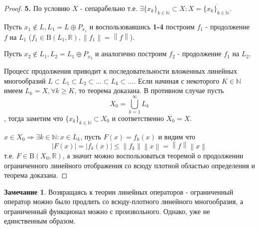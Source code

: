 \documentclass[12pt,a4paper]{article}
\theoremstyle{definition}
\newtheorem{corollaryth}{Замечание}[theorem]
\newcommand{\Real}{\mathbb{R}}
\newcommand{\Natural}{\mathbb{N}}
\newcommand{\norm}[1]{\left\lVert#1\right\rVert}
\newcommand{\bounded}[2]{\textrm{B}(#1, #2)}
\newcommand{\seq}[2]{\{#1\}_{#2}}
\begin{document}
\begin{proof}
	\textbf{5.} По условию $X$ - сепарабельно т.е. $\exists \seq{x_k}{k \in \Natural} \subset X: X = \overline{\seq{x_k}{k \in \Natural}}$. \newline
	
	\noindent Пусть $x_1 \notin L, L_1 = L \oplus P_{x_1}$ и воспользовавшись \textbf{1-4} построим $f_1$ - продолжение $f$ на $L_1$ ($f_1 \in \bounded{L_1}{\Real}, \norm{f_1} = \norm{f}$). \newline
	
	\noindent Пусть $x_2 \notin L_1, L_2 = L_1 \oplus P_{x_2}$ и аналогично построим $f_2$ - продолжение $f_1$ на $L_2$. \newline
	
	\noindent Процесс продолжения приводит к последовательности вложенных линейных многообразий $L \subset L_1 \subset L_2 \subset ... \subset L_k \subset ...$. Если начиная с некоторого $K \in \Natural$ имеем $L_k = X, \forall k \geq K$, то теорема доказана. В противном случае пусть $$X_0 = \bigcup_{k=1}^{\infty}{L_k}$$, тогда заметим что $\seq{x_k}{k \in \Natural} \subset X_0$ и соответственно $\overline{X_0} = X$. \newline
	
	\noindent $x \in X_0 \Rightarrow \exists k \in \Natural: x \in L_k$, пусть $F(x) = f_k (x)$ и видим что $$|F(x)| = |f_k (x)| \leq \norm{f_k}\norm{x} = \norm{f}\norm{x}$$ т.е. $F \in \bounded{X_0}{\Real}$, а значит можно воспользоваться теоремой о продолжении ограниченного линейного отображения со всюду плотной областью определения и теорема доказана. 
\end{proof}
\begin{corollaryth}
	Возвращаясь к теории линейных операторов - ограниченный оператор можно было продлить со всюду-плотного линейного многообразия, а ограниченный функционал можно с произвольного. Однако, уже не единственным образом.
\end{corollaryth}
\end{document}
